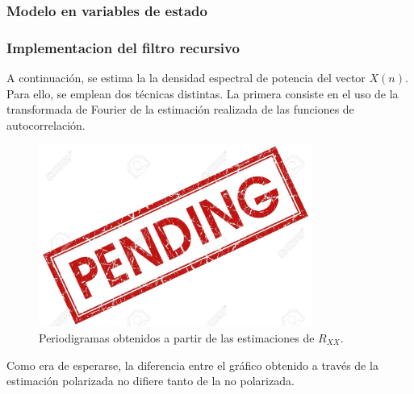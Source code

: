 \subsubsection{Modelo en variables de estado}



\subsubsection{Implementacion del filtro recursivo}
A continuación, se estima la la densidad espectral de potencia del vector $X(n)$. Para ello, se emplean dos técnicas distintas. La primera consiste en el uso de la transformada de Fourier de la estimación realizada de las funciones de autocorrelación.
\begin{figure}[H]
\centering
	\includegraphics[width=0.8\textwidth, trim = {0 0 0 0},clip]{./Imagenes/pend.jpg}
	\caption{Periodigramas obtenidos a partir de las estimaciones de $R_{XX}$.}
	\label{fig:period-est}
\end{figure}

Como era de esperarse, la diferencia entre el gráfico obtenido a través de la estimación polarizada no difiere tanto de la no polarizada.

